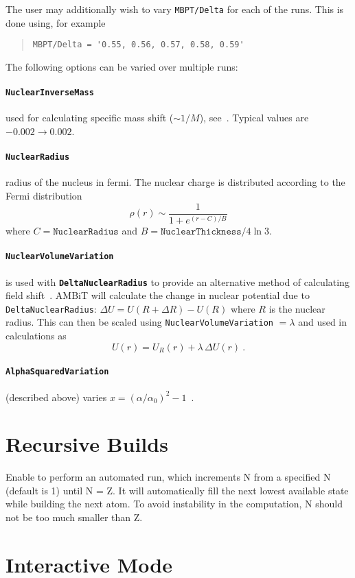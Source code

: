 \documentclass[a4paper,11pt]{article}
\newcommand{\option}[1]{\paragraph{\texttt{#1}}}
\begin{document}
The user may additionally wish to vary \texttt{MBPT/Delta} for each of the runs. This is done using, for example
\begin{quote}
\begin{verbatim}
MBPT/Delta = '0.55, 0.56, 0.57, 0.58, 0.59'
\end{verbatim}
\end{quote}

The following options can be varied over multiple runs:
\option{NuclearInverseMass} used for calculating specific mass shift ($\sim 1/M$), see~\cite{berengut03pra,berengut05pra,berengut06pra}. Typical values are $-0.002 \rightarrow 0.002$.
\option{NuclearRadius} radius of the nucleus in fermi. The nuclear charge is distributed according to the Fermi distribution
\[
\rho(r) \sim \frac{1}{1 + e^{(r - C)/B}}
\]
where $C = \texttt{NuclearRadius}$ and $B = \texttt{NuclearThickness}/4\ln 3$.

\option{NuclearVolumeVariation} is used with \texttt{\textbf{DeltaNuclearRadius}} to provide an alternative method of calculating field shift~\cite{berengut03pra}. AMBiT will calculate the change in nuclear potential due to \texttt{DeltaNuclearRadius}: $\Delta U = U(R+\Delta R) - U(R)$ where $R$ is the nuclear radius. This can then be scaled using \texttt{NuclearVolumeVariation} $=\lambda$ and used in calculations as
\[
	U(r) = U_R(r) + \lambda\, \Delta U(r)\ .
\]

\option{AlphaSquaredVariation} (described above) varies $x = (\alpha/\alpha_0)^2-1$~\cite{dzuba99pra}.

\section{Recursive Builds}

Enable to perform an automated run, which increments N from a specified N (default is 1) until N = Z. It will automatically fill the next lowest available state while building the next atom. To avoid instability in the computation, N should not be too much smaller than Z.

\section{Interactive Mode}
\end{document}
